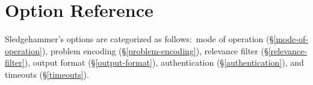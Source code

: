 \documentclass[a4paper,12pt]{article}
\def\qtybf#1{$\mathbf{\left<\textbf{\textit{#1\/}}\right>}$}
\begin{document}
\section{Option Reference}
\label{option-reference}

\def\defl{\{}
\def\defr{\}}

\def\flushitem#1{\item[]\noindent\kern-\leftmargin \textbf{#1}}
\def\optrueonly#1{\flushitem{\textit{#1} $\bigl[$= \textit{true}$\bigr]$\enskip}\nopagebreak\\[\parskip]}
\def\optrue#1#2{\flushitem{\textit{#1} $\bigl[$= \qtybf{bool}$\bigr]$\enskip \defl\textit{true}\defr\hfill (neg.: \textit{#2})}\nopagebreak\\[\parskip]}
\def\opfalse#1#2{\flushitem{\textit{#1} $\bigl[$= \qtybf{bool}$\bigr]$\enskip \defl\textit{false}\defr\hfill (neg.: \textit{#2})}\nopagebreak\\[\parskip]}
\def\opsmart#1#2{\flushitem{\textit{#1} $\bigl[$= \qtybf{smart\_bool}$\bigr]$\enskip \defl\textit{smart}\defr\hfill (neg.: \textit{#2})}\nopagebreak\\[\parskip]}
\def\opsmartx#1#2{\flushitem{\textit{#1} $\bigl[$= \qtybf{smart\_bool}$\bigr]$\enskip \defl\textit{smart}\defr\\\hbox{}\hfill (neg.: \textit{#2})}\nopagebreak\\[\parskip]}
\def\opnodefault#1#2{\flushitem{\textit{#1} = \qtybf{#2}} \nopagebreak\\[\parskip]}
\def\opnodefaultbrk#1#2{\flushitem{$\bigl[$\textit{#1} =$\bigr]$ \qtybf{#2}} \nopagebreak\\[\parskip]}
\def\opdefault#1#2#3{\flushitem{\textit{#1} = \qtybf{#2}\enskip \defl\textit{#3}\defr} \nopagebreak\\[\parskip]}
\def\oparg#1#2#3{\flushitem{\textit{#1} \qtybf{#2} = \qtybf{#3}} \nopagebreak\\[\parskip]}
\def\opargbool#1#2#3{\flushitem{\textit{#1} \qtybf{#2} $\bigl[$= \qtybf{bool}$\bigr]$\hfill (neg.: \textit{#3})}\nopagebreak\\[\parskip]}
\def\opargboolorsmart#1#2#3{\flushitem{\textit{#1} \qtybf{#2} $\bigl[$= \qtybf{smart\_bool}$\bigr]$\hfill (neg.: \textit{#3})}\nopagebreak\\[\parskip]}

Sledgehammer's options are categorized as follows:\ mode of operation
(\S\ref{mode-of-operation}), problem encoding (\S\ref{problem-encoding}),
relevance filter (\S\ref{relevance-filter}), output format
(\S\ref{output-format}), authentication (\S\ref{authentication}), and timeouts
(\S\ref{timeouts}).
\end{document}
